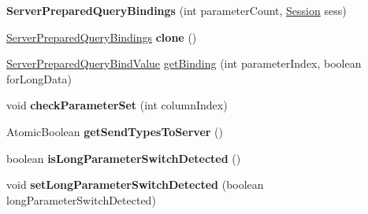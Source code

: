 \begin{DoxyCompactItemize}
\item 
\mbox{\label{classcom_1_1mysql_1_1cj_1_1_server_prepared_query_bindings_ab65a68783b4405e29b56c86ba0f58d30}} 
{\bfseries Server\+Prepared\+Query\+Bindings} (int parameter\+Count, \mbox{\hyperlink{interfacecom_1_1mysql_1_1cj_1_1_session}{Session}} sess)
\item 
\mbox{\label{classcom_1_1mysql_1_1cj_1_1_server_prepared_query_bindings_a846a05c42a42c694efa17b4320d5b428}} 
\mbox{\hyperlink{classcom_1_1mysql_1_1cj_1_1_server_prepared_query_bindings}{Server\+Prepared\+Query\+Bindings}} {\bfseries clone} ()
\item 
\mbox{\hyperlink{classcom_1_1mysql_1_1cj_1_1_server_prepared_query_bind_value}{Server\+Prepared\+Query\+Bind\+Value}} \mbox{\hyperlink{classcom_1_1mysql_1_1cj_1_1_server_prepared_query_bindings_a15f0b3974435b3e95fcbbe4a050fb5d6}{get\+Binding}} (int parameter\+Index, boolean for\+Long\+Data)
\item 
\mbox{\label{classcom_1_1mysql_1_1cj_1_1_server_prepared_query_bindings_a2fe01e3785026b382a42326560cf3ea9}} 
void {\bfseries check\+Parameter\+Set} (int column\+Index)
\item 
\mbox{\label{classcom_1_1mysql_1_1cj_1_1_server_prepared_query_bindings_ae8828a315e21c8947dc86d0ef3868f89}} 
Atomic\+Boolean {\bfseries get\+Send\+Types\+To\+Server} ()
\item 
\mbox{\label{classcom_1_1mysql_1_1cj_1_1_server_prepared_query_bindings_a042277eb60cfb95149365faf474b5188}} 
boolean {\bfseries is\+Long\+Parameter\+Switch\+Detected} ()
\item 
\mbox{\label{classcom_1_1mysql_1_1cj_1_1_server_prepared_query_bindings_a3fabbd97aff480c661dcf94c166ef0fa}} 
void {\bfseries set\+Long\+Parameter\+Switch\+Detected} (boolean long\+Parameter\+Switch\+Detected)
\item 
\mbox{\label{classcom_1_1mysql_1_1cj_1_1_server_prepared_query_bindings_abaa9240c510b15134f50869c2d0b1d72}} 

\end{DoxyCompactItemize}
